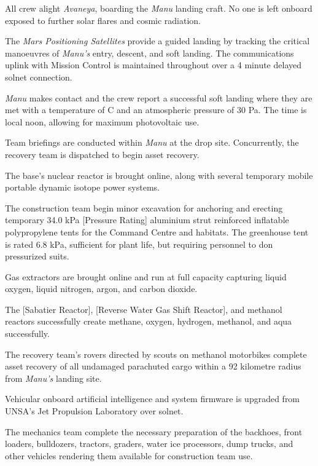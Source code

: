 All crew alight {\it Avaneya}, boarding the {\it Manu} landing craft. No one is left onboard exposed to further solar flares and cosmic radiation.

The {\it Mars Positioning Satellites} provide a guided landing by tracking the critical manoeuvres of {\it Manu's} entry, descent, and soft landing. The communications uplink with Mission Control is maintained throughout over a 4 minute delayed solnet connection.

{\it Manu} makes contact and the crew report a successful soft landing where they are met with a temperature of C and an atmospheric pressure of 30 Pa. The time is local noon, allowing for maximum photovoltaic use.

Team briefings are conducted within {\it Manu} at the drop site. Concurrently, the recovery team is dispatched to begin asset recovery.

The base's nuclear reactor is brought online, along with several temporary mobile portable dynamic isotope power systems.

The construction team begin minor excavation for anchoring and erecting temporary 34.0 kPa [Pressure Rating] aluminium strut reinforced inflatable polypropylene tents for the Command Centre and habitats. The greenhouse tent is rated 6.8 kPa, sufficient for plant life, but requiring personnel to don pressurized suits.
\StopTimelineDate

Gas extractors are brought online and run at full capacity capturing liquid oxygen, liquid nitrogen, argon, and carbon dioxide. 

The [Sabatier Reactor], [Reverse Water Gas Shift Reactor], and methanol reactors successfully create methane, oxygen, hydrogen, methanol, and aqua successfully.
\StopTimelineDate

The recovery team's rovers directed by scouts on methanol motorbikes complete asset recovery of all undamaged parachuted cargo within a 92 kilometre radius from {\it Manu's} landing site.
\StopTimelineDate

Vehicular onboard artificial intelligence and system firmware is upgraded from UNSA's Jet Propulsion Laboratory over solnet.

The mechanics team complete the necessary preparation of the backhoes, front loaders, bulldozers, tractors, graders, water ice processors, dump trucks, and other vehicles rendering them available for construction team use.

